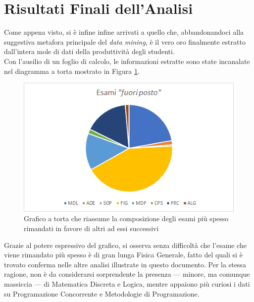 \section{Risultati Finali dell'Analisi}

    Come appena visto, si è infine infine arrivati a quello che, abbandonandoci alla suggestiva metafora principale del \textit{data mining}, è il vero oro finalmente estratto dall'intera mole di dati della produttività degli studenti. \\

    Con l'ausilio di un foglio di calcolo, le informazioni estratte sono state incanalate nel diagramma a torta mostrato in Figura \ref{fine}. \\

      \begin{figure}
        \centering
        \caption{Grafico a torta che riassume la composizione degli esami più spesso rimandati in favore di altri ad essi successivi}
        \label{fine}
        \includegraphics[scale=0.80]{../seq/out_of_place.png}
    \end{figure}

    Grazie al potere espressivo del grafico, si osserva senza difficoltà che l'esame che viene rimandato più spesso è di gran lunga Fisica Generale, fatto del quali si è trovato conferma nelle altre analisi illustrate in questo documento. Per la stessa ragione, non è da considerarsi sorprendente la presenza --- minore, ma comunque massiccia --- di Matematica Discreta e Logica, mentre appaiono più curiosi i dati su Programazione Concorrente e Metodologie di Programazione.